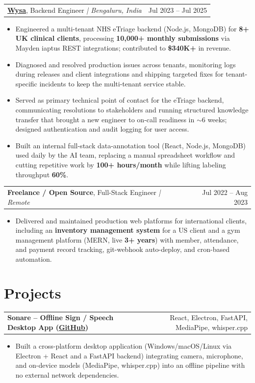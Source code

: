 \documentclass[letterpaper,11pt]{article}
\makeatletter
\newcommand{\expItem}[4]{%
  \vspace{2pt}
  \begin{tabular*}{\textwidth}{@{}l@{\extracolsep{\fill}}r@{}}
    \textbf{#1}, #2 \textit{| #3} & #4 \\
  \end{tabular*}\par\vspace{-3pt}
}
\newcommand{\projItem}[2]{%
  \vspace{2pt}
  \begin{tabular*}{\textwidth}{@{}l@{\extracolsep{\fill}}r@{}}
    \textbf{#1} & #2 \\
  \end{tabular*}\par\vspace{-3pt}
}
\makeatother
\begin{document}
\expItem{\href{https://www.wysa.io}{Wysa}}{Backend Engineer}{Bengaluru, India}{Jul 2023 -- Jul 2025}
\begin{itemize}
  \item Engineered a multi-tenant NHS eTriage backend (Node.js, MongoDB) for \textbf{8+ UK clinical clients}, processing \textbf{10{,}000+ monthly submissions} via Mayden iaptus REST integrations; contributed to \textbf{\$340K+} in revenue.
  \item Diagnosed and resolved production issues across tenants, monitoring logs during releases and client integrations and shipping targeted fixes for tenant-specific incidents to keep the multi-tenant service stable.
  \item Served as primary technical point of contact for the eTriage backend, communicating resolutions to stakeholders and running structured knowledge transfer that brought a new engineer to on-call readiness in $\sim$6 weeks; designed authentication and audit logging for user access.
  \item Built an internal full-stack data-annotation tool (React, Node.js, MongoDB) used daily by the AI team, replacing a manual spreadsheet workflow and cutting repetitive work by \textbf{100+ hours/month} while lifting labeling throughput \textbf{60\%}.
\end{itemize}

\expItem{Freelance / Open Source}{Full-Stack Engineer}{Remote}{Jul 2022 -- Aug 2023}
\begin{itemize}
  \item Delivered and maintained production web platforms for international clients, including an \textbf{inventory management system} for a US client and a gym management platform (MERN, live \textbf{3+ years}) with member, attendance, and payment record tracking, git-webhook auto-deploy, and cron-based automation.
\end{itemize}

\section{Projects}

\projItem{Sonare -- Offline Sign / Speech Desktop App {\normalfont\small(\href{https://github.com/Deva-1903/Qualcomm-Sep25-Team-Sonare}{GitHub})}}{React, Electron, FastAPI, MediaPipe, whisper.cpp}
\begin{itemize}
  \item Built a cross-platform desktop application (Windows/macOS/Linux via Electron + React and a FastAPI backend) integrating camera, microphone, and on-device models (MediaPipe, whisper.cpp) into an offline pipeline with no external network dependencies.
\end{itemize}
\end{document}
